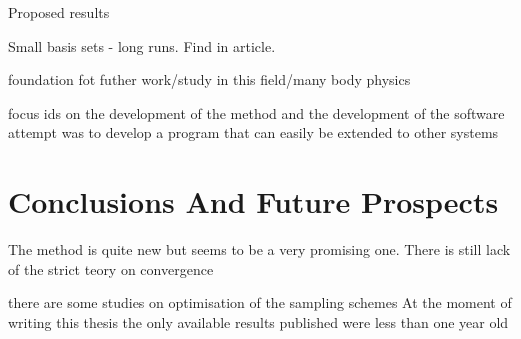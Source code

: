 \documentclass[twoside,english]{uiofysmaster}
\begin{document}
Proposed results

Small basis sets - long runs. Find in article.



foundation fot futher work/study in this field/many body physics

focus ids on the development of the method and the development of the software
attempt was to develop a program that can easily be extended to other systems



\section{Conclusions And Future Prospects}

The method is quite new but seems to be a very promising one. There is still lack of the strict teory on convergence 

there are some studies on optimisation of the sampling schemes
At the moment of writing this thesis the only available results published were less than one year old


\appendix
\renewcommand{\thesection}{\Alph{section}.\arabic{section}}
\setcounter{section}{0}
\end{document}
